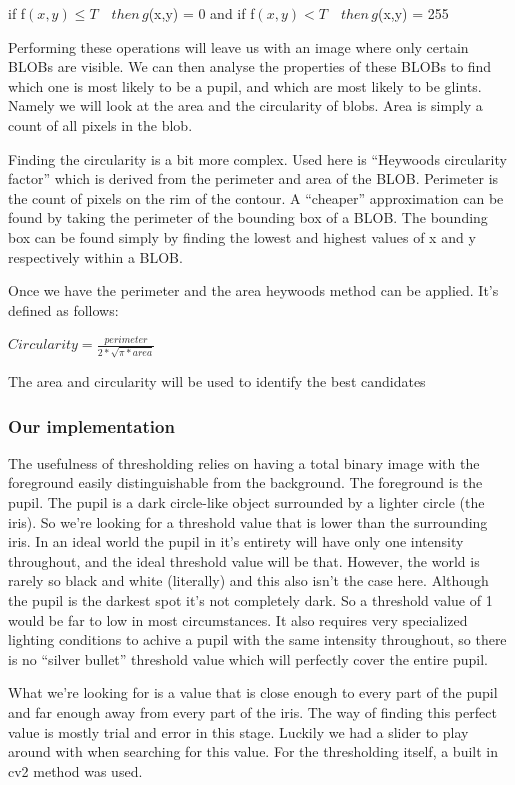 if f$(x,y) \leq T \quad then \, g$(x,y) = 0 \quad and \quad if
f$(x,y) < T \quad then \, g$(x,y) = 255

Performing these operations will leave us with an image where only
certain BLOBs are visible. We can then analyse the properties of these
BLOBs to find which one is most likely to be a pupil, and which are most
likely to be glints. Namely we will look at the area and the circularity
of blobs. Area is simply a count of all pixels in the blob.

Finding the circularity is a bit more complex. Used here is ``Heywoods
circularity factor'' which is derived from the perimeter and area of the
BLOB. Perimeter is the count of pixels on the rim of the contour. A
``cheaper'' approximation can be found by taking the perimeter of the
bounding box of a BLOB. The bounding box can be found simply by finding
the lowest and highest values of x and y respectively within a BLOB.

Once we have the perimeter and the area heywoods method can be applied.
It's defined as follows:

$Circularity = \frac {perimeter} {2 * \sqrt{\pi * area}}$

The area and circularity will be used to identify the best candidates

\subsubsection{Our implementation}

The usefulness of thresholding relies on having a total binary image
with the foreground easily distinguishable from the background. The
foreground is the pupil. The pupil is a dark circle-like object
surrounded by a lighter circle (the iris). So we're looking for a
threshold value that is lower than the surrounding iris. In an ideal
world the pupil in it's entirety will have only one intensity
throughout, and the ideal threshold value will be that. However, the
world is rarely so black and white (literally) and this also isn't the
case here. Although the pupil is the darkest spot it's not completely
dark. So a threshold value of 1 would be far to low in most
circumstances. It also requires very specialized lighting conditions to
achive a pupil with the same intensity throughout, so there is no
``silver bullet'' threshold value which will perfectly cover the entire
pupil.

What we're looking for is a value that is close enough to every part of
the pupil and far enough away from every part of the iris. The way of
finding this perfect value is mostly trial and error in this stage.
Luckily we had a slider to play around with when searching for this
value. For the thresholding itself, a built in cv2 method was used.


